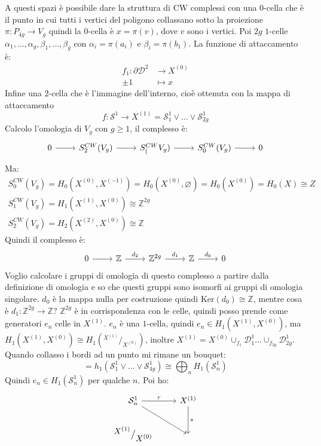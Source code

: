 \documentclass[10pt, twoside=false, x11names]{scrbook}
\newcommand{\Z}{\mathbb{Z}}
\renewcommand{\ker}[1]{\mathrm{Ker}( #1)}
\newcommand{\Sph}[1][]{\mathcal{S}^#1}
\newcommand{\Disk}[1][]{\mathcal{D}^#1}
\newcommand*\quot[2]{{^{\textstyle #1}\big/_{\textstyle #2}}}
\let\emptyset\varnothing
\begin{document}
A questi spazi è possibile dare la struttura di CW complessi
con una $ 0 $-cella che è il punto in cui tutti i vertici del
poligono collassano sotto la proiezione $ \pi \colon P_{4g} \to V_g $
quindi la $ 0 $-cella è $ x = \pi(v) $, dove $ v $ sono i vertici.
Poi $ 2 g $ $ 1 $-celle $ \alpha_1, \dots, \alpha_g, \beta_1, \dots, \beta_g $ con
$ \alpha_i = \pi(a_i) $ e $ \beta_i = \pi(b_1) $. La funzione di attaccamento
è:
\begin{align*}
  f_1 \colon \partial \Disk{2} & \to X^{(0)} \\
  \pm 1 & \mapsto x
\end{align*}
Infine una $ 2 $-cella
che è l'immagine dell'interno, cioè ottenuta con la mappa
di attaccamento
\[
  f \colon \Sph{1} \to X^{(1)} = \Sph{1}_1 \vee \dots \vee \Sph{1}_{2g}
\]
Calcolo l'omologia di $ V_g $ con $ g \geq 1 $, il complesso
è:
\[
  \begin{tikzcd}
    0 \rar & S^{CW}_2(V_g) \rar & S^{CW}_(V_g) \rar & S^{CW}_0(V_g) \rar & 0
  \end{tikzcd}
\]
Ma:
\begin{gather*}
  S^{CW}_0(V_g) = H_0(X^{(0)}, X^{(-1)}) = H_0(X^{(0)}, \emptyset) = H_0(X^{(0)}) = H_0(X) \cong Z \\
  S^{CW}_1(V_g) = H_1(X^{(1)}, X^{(0)}) \cong \Z^{2g} \\
  S^{CW}_2(V_g) = H_2(X^{(2)}, X^{(0)}) \cong \Z
\end{gather*}
Quindi il complesso è:
\[
  \begin{tikzcd}
    0 \rar & \Z \rar{d_2} & \Z^{2g} \rar{d_1} & \Z \rar{d_0} & 0
  \end{tikzcd}
\]
Voglio calcolare i gruppi di omologia di questo complesso a partire dalla definizione
di omologia e so che questi gruppi sono isomorfi ai gruppi di omologia singolare.
$ d_0 $ è la mappa nulla per costruzione quindi $ \ker{d_0} \cong \Z $, mentre cosa è
$ d_1 \colon \Z^{2g} \to \Z $? $ \Z^{2g} $ è in corrispondenza con le celle, quindi posso
prende come generatori $ e_n $ celle in $ X^{(1)} $. $ e_n $ è una $ 1 $-cella, quindi
$ e_n \in H_1(X^{(1)}, X^{(0)}) $, ma $ H_1(X^{(1)}, X^{(0)}) \cong H_1(\quot{X^{(1)}}{X^{(0)}}) $,
inoltre $ X^{(1)} = X^{(0)} \cup_{f_1} \Disk{1}_1 \dots \cup_{f_{2g}} \Disk{1}_{2g} $. Quando collasso
i bordi ad un punto mi rimane un bouquet:
\[
  = h_1(\Sph{1}_1 \vee \dots \vee \Sph{1}_{4g}) \cong \bigoplus_n H_1(\Sph{1}_n)
\]
Quindi $ e_n \in H_1(\Sph{1}_n) $ per qualche $ n $. Poi ho:
\[
  \begin{tikzcd}
    \Sph{1}_n \rar{r} \arrow{dr}{} & X^{(1)} \dar{s} \\
    \quot{X^{(1)}}{X^{(0)}} & {}
  \end{tikzcd}
\]
\end{document}
